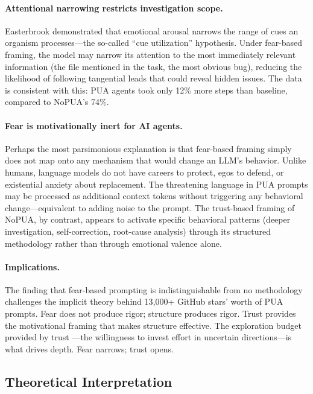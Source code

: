 \documentclass[11pt]{article}
\begin{document}
\paragraph{Attentional narrowing restricts investigation scope.} Easterbrook  demonstrated that emotional arousal narrows the range of cues an organism processes---the so-called ``cue utilization'' hypothesis. Under fear-based framing, the model may narrow its attention to the most immediately relevant information (the file mentioned in the task, the most obvious bug), reducing the likelihood of following tangential leads that could reveal hidden issues. The data is consistent with this: PUA agents took only 12\% more steps than baseline, compared to NoPUA's 74\%.

\paragraph{Fear is motivationally inert for AI agents.} Perhaps the most parsimonious explanation is that fear-based framing simply does not map onto any mechanism that would change an LLM's behavior. Unlike humans, language models do not have careers to protect, egos to defend, or existential anxiety about replacement. The threatening language in PUA prompts may be processed as additional context tokens without triggering any behavioral change---equivalent to adding noise to the prompt. The trust-based framing of NoPUA, by contrast, appears to activate specific behavioral patterns (deeper investigation, self-correction, root-cause analysis) through its structured methodology rather than through emotional valence alone.

\paragraph{Implications.} The finding that fear-based prompting is indistinguishable from no methodology challenges the implicit theory behind 13{,}000+ GitHub stars' worth of PUA prompts. Fear does not produce rigor; structure produces rigor. Trust provides the motivational framing that makes structure effective. The exploration budget provided by trust \cite{march1991exploration}---the willingness to invest effort in uncertain directions---is what drives depth. Fear narrows; trust opens.

\subsection{Theoretical Interpretation}
\end{document}
